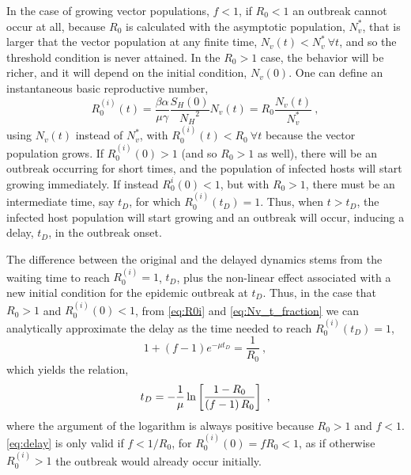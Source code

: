 In the case of growing vector populations, $f<1$, if $R_0<1$ an outbreak
cannot occur at all, because $R_0$ is calculated with the asymptotic
population, $N_v^*$, that is larger that the vector population at any finite
time, $N_v(t)<N_v^* \ \forall t$, and so the threshold condition is never
attained. In the $R_0>1$ case, the behavior will be richer, and it will depend
on the initial condition, $N_v(0)$. One can define an instantaneous basic
reproductive number,
\begin{equation}\label{eq:R0i}
    R_0^{(i)}(t)=\frac{\beta\alpha}{\mu\gamma}\frac{S_H(0)}{{N_H}^2}
    N_v(t)=R_0\frac{N_v(t)}{N_v^*} \ ,
\end{equation}
using $N_v(t)$ instead of $N_v^*$, with $R_0^{(i)}(t)<R_0 \ \forall t$
because the vector population grows. If $R_0^{(i)}(0)>1$ (and so $R_0>1$ as
well), there will be an outbreak occurring for short times, and the population
of infected hosts will start growing immediately. If instead $R_0^i(0)<1$, but
with $R_0>1$, there must be an intermediate time, say $t_D$, for which
$R_0^{(i)}(t_D)=1$. Thus, when $t>t_D$, the infected host population will start
growing and an outbreak will occur, inducing a delay, $t_D$, in the outbreak
onset.

The difference between the original and the delayed dynamics stems from the
waiting time to reach $R_0^{(i)}=1$, $t_D$, plus the non-linear effect
associated with a new initial condition for the epidemic outbreak at $t_D$.
Thus,
in the case that $R_0>1$ and $R_0^{(i)}(0)<1$, from \cref{eq:R0i} and
\cref{eq:Nv_t_fraction} we can analytically approximate the delay as the time
needed to reach $R_0^{(i)}(t_D)=1$,
\begin{equation}
    {1+(f-1)e^{-\mu t_D}}=\frac{1}{R_0} \ ,
\end{equation}
which yields the relation,
\begin{equation}\label{eq:delay}
    t_D=-\frac{1}{\mu}\ln\claudator{\frac{1-R_0}{\parentesi{f-1}R_0}}\ ,
\end{equation}
where the argument of the logarithm is always positive because $R_0>1$ and
$f<1$. \cref{eq:delay} is only valid if $f<1/R_0$, for $R_0^{(i)}(0)=f R_0<1$,
as if otherwise $R_0^{(i)}>1$ the outbreak would already occur initially.

